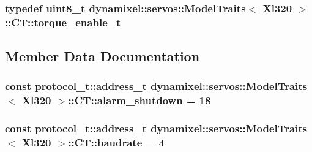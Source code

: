 \subsubsection[{\texorpdfstring{torque\+\_\+enable\+\_\+t}{torque_enable_t}}]{\setlength{\rightskip}{0pt plus 5cm}typedef uint8\+\_\+t {\bf dynamixel\+::servos\+::\+Model\+Traits}$<$ {\bf Xl320} $>$\+::{\bf C\+T\+::torque\+\_\+enable\+\_\+t}}\hypertarget{structdynamixel_1_1servos_1_1_model_traits_3_01_xl320_01_4_1_1_c_t_a0ca77b888fb8184c4467459ba36ba780}{}\label{structdynamixel_1_1servos_1_1_model_traits_3_01_xl320_01_4_1_1_c_t_a0ca77b888fb8184c4467459ba36ba780}


\subsection{Member Data Documentation}
\subsubsection[{\texorpdfstring{alarm\+\_\+shutdown}{alarm_shutdown}}]{\setlength{\rightskip}{0pt plus 5cm}const {\bf protocol\+\_\+t\+::address\+\_\+t} {\bf dynamixel\+::servos\+::\+Model\+Traits}$<$ {\bf Xl320} $>$\+::C\+T\+::alarm\+\_\+shutdown = 18\hspace{0.3cm}{\ttfamily [static]}}\hypertarget{structdynamixel_1_1servos_1_1_model_traits_3_01_xl320_01_4_1_1_c_t_ae3c19d958ec815974930cd8218eed68d}{}\label{structdynamixel_1_1servos_1_1_model_traits_3_01_xl320_01_4_1_1_c_t_ae3c19d958ec815974930cd8218eed68d}
\subsubsection[{\texorpdfstring{baudrate}{baudrate}}]{\setlength{\rightskip}{0pt plus 5cm}const {\bf protocol\+\_\+t\+::address\+\_\+t} {\bf dynamixel\+::servos\+::\+Model\+Traits}$<$ {\bf Xl320} $>$\+::C\+T\+::baudrate = 4\hspace{0.3cm}{\ttfamily [static]}}\hypertarget{structdynamixel_1_1servos_1_1_model_traits_3_01_xl320_01_4_1_1_c_t_ad1753eaa226ee1c32d7a366084e6afc3}{}\label{structdynamixel_1_1servos_1_1_model_traits_3_01_xl320_01_4_1_1_c_t_ad1753eaa226ee1c32d7a366084e6afc3}

